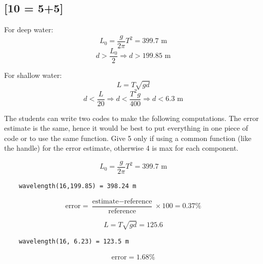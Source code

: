 \documentclass[a4paper,english]{scrartcl}
\begin{document}
\subsection{[10 = 5+5]}



For deep water:
\begin{equation}
    L_0 = \frac{g}{2\pi} T^2 = 399.7 \text{ m}
\end{equation}
\begin{equation}
    d > \frac{L_0}{2} \Rightarrow d > 199.85 \text{ m}
\end{equation}

For shallow water:
\begin{equation}
    L = T \sqrt{g d}
\end{equation}
\begin{equation}
    d < \frac{L}{20} \Rightarrow d < \frac{T^2 g}{400} \Rightarrow d < 6.3 \text{ m}
\end{equation}

The students can write two codes to make the following computations. The error estimate is the same, hence it would be best to put everything in one piece of code or to use the same function. Give 5 only if using a common function (like the \@ handle) for the error estimate, otherwise 4 is max for each component.


\begin{equation}
    L_0 = \frac{g}{2\pi} T^2 = 399.7 \text{ m}
\end{equation}
\begin{verbatim}
    wavelength(16,199.85) = 398.24 m
\end{verbatim}
\begin{equation}
    \text{error} = \frac{\text{estimate} - \text{reference}}{\text{reference}} \times 100 = 0.37\%
\end{equation}

\begin{equation}
    L = T \sqrt{g d} = 125.6
\end{equation}
\begin{verbatim}
    wavelength(16, 6.23) = 123.5 m
\end{verbatim}
\begin{equation}
    \text{error} = 1.68\%
\end{equation}
\end{document}
